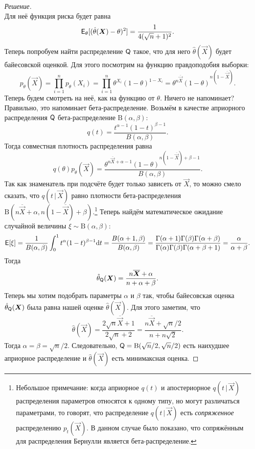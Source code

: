 \begin{proof}[Решение]
\[    \]
    Для неё функция риска будет равна
    \[
        \operatorname{\mathsf{E}}_{\theta}[(\hat{\theta}(\bm{X}) - \theta)^{2}] = \frac{1}{4(\sqrt{n} + 1)^{2}}.
    \]
    Теперь попробуем найти распределение $\mathsf{Q}$ такое, что для него $\hat{\theta}(\vec{X})$ будет байесовской оценкой. Для этого посмотрим на функцию правдоподобия выборки:
    \[
        p_{\theta}(\vec{X}) = \prod_{i = 1}^{n} p_{\theta}(X_{i}) = \prod_{i = 1}^{n} \theta^{X_{i}}(1 - \theta)^{1 - X_{i}} = \theta^{n\overline{\vec{X}}}(1 - \theta)^{n(1 - \overline{\vec{X}})}. 
    \]
    Теперь будем смотреть на неё, как на функцию от $\theta$. Ничего не напоминает? Правильно, это напоминает бета-распределение. Возьмём в качестве априорного распределения $\mathsf{Q}$ бета-распределение $\mathrm{B}(\alpha, \beta)$:
    \[
        q(t) = \frac{t^{\alpha - 1}(1 - t)^{\beta - 1}}{B(\alpha, \beta)}.
    \]
    Тогда совместная плотность распределения равна
    \[
        q(\theta)p_{\theta}(\vec{X}) = \frac{\theta^{n\overline{\vec{X}} + \alpha - 1}(1 - \theta)^{n(1 - \overline{\vec{X}}) + \beta - 1}}{B(\alpha, \beta)}.
    \]
    Так как знаменатель при подсчёте будет только зависеть от $\vec{X}$, то можно смело сказать, что $q(t\,|\,\vec{X})$ равно плотности бета-распределения $\mathrm{B}(n\overline{\vec{X}} + \alpha, n(1 - \overline{\vec{X}}) + \beta)$.\footnote{Небольшое примечание: когда априорное $q(t)$ и апостериорное $q(t\,|\,\vec{X})$ распределения параметров относятся к одному типу, но могут различаться параметрами, то говорят, что распределение $q(t\,|\,\vec{X})$ есть \emph{сопряженное} распределению $p_{t}(\vec{X})$. В данном случае было показано, что сопряжённым для распределения Бернулли является бета-распределение.} Теперь найдём математическое ожидание случайной величины $\xi \sim \mathrm{B}(\alpha, 
    \beta)$:
    \[
        \operatorname{\mathsf{E}}[\xi] = \frac{1}{B(\alpha, \beta)}\int_{0}^{1} t^{\alpha}(1 - t)^{\beta - 1}\dd t = \frac{B(\alpha + 1, \beta)}{B(\alpha, \beta)} = \frac{\Gamma(\alpha + 1)\Gamma(\beta)\Gamma(\alpha + \beta)}{\Gamma(\alpha)\Gamma(\beta)\Gamma(\alpha + \beta + 1)} = \frac{\alpha}{\alpha + \beta}.
    \]
    Тогда
    \[
        \hat{\theta}_{\mathsf{Q}}(\bm{X}) = \frac{n\overline{\bm{X}} + \alpha}{n + \alpha + \beta}.
    \]
    Теперь мы хотим подобрать параметры $\alpha$ и $\beta$ так, чтобы байесовская оценка $\hat{\theta}_{\mathsf{Q}}(\bm{X})$ была равна нашей оценке $\hat{\theta}(\vec{X})$. Для этого заметим, что
    \[
        \hat{\theta}(\vec{X}) = \frac{2\sqrt{n}\overline{\vec{X}} + 1}{2\sqrt{n} + 2} = \frac{n\overline{\vec{X}} + \sqrt{n}/2}{n + n\sqrt{2}}.
    \]
    Тогда $\alpha = \beta = \sqrt{n}/2$. Следовательно, $\mathsf{Q} = \mathrm{B}(\sqrt{n}/2, \sqrt{n}/2)$ есть наихудшее априорное распределение и $\hat{\theta}(\vec{X})$ есть минимаксная оценка.
\end{proof}

